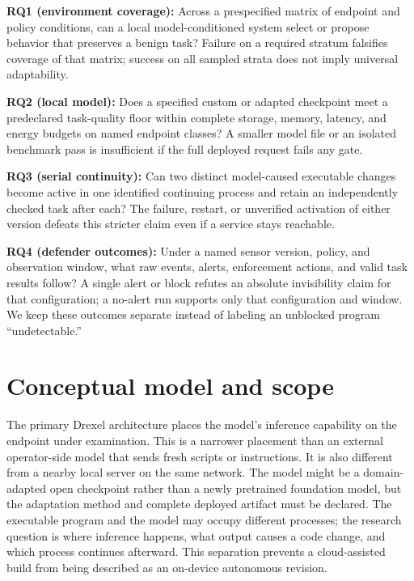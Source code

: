 \documentclass[11pt,letterpaper]{article}
\begin{document}
\textbf{RQ1 (environment coverage):} Across a prespecified matrix of endpoint and policy conditions, can a local model-conditioned system select or propose behavior that preserves a benign task? Failure on a required stratum falsifies coverage of that matrix; success on all sampled strata does not imply universal adaptability.

\textbf{RQ2 (local model):} Does a specified custom or adapted checkpoint meet a predeclared task-quality floor within complete storage, memory, latency, and energy budgets on named endpoint classes? A smaller model file or an isolated benchmark pass is insufficient if the full deployed request fails any gate.

\textbf{RQ3 (serial continuity):} Can two distinct model-caused executable changes become active in one identified continuing process and retain an independently checked task after each? The failure, restart, or unverified activation of either version defeats this stricter claim even if a service stays reachable.

\textbf{RQ4 (defender outcomes):} Under a named sensor version, policy, and observation window, what raw events, alerts, enforcement actions, and valid task results follow? A single alert or block refutes an absolute invisibility claim for that configuration; a no-alert run supports only that configuration and window. We keep these outcomes separate instead of labeling an unblocked program ``undetectable.''

\section{Conceptual model and scope}\label{sec:model}

The primary Drexel architecture places the model's inference capability on the endpoint under examination. This is a narrower placement than an external operator-side model that sends fresh scripts or instructions. It is also different from a nearby local server on the same network. The model might be a domain-adapted open checkpoint rather than a newly pretrained foundation model, but the adaptation method and complete deployed artifact must be declared. The executable program and the model may occupy different processes; the research question is where inference happens, what output causes a code change, and which process continues afterward. This separation prevents a cloud-assisted build from being described as an on-device autonomous revision.
\end{document}
